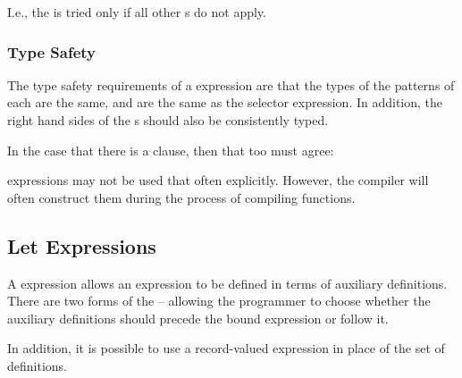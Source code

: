 \begin{aside}
I.e., the   is tried only if all other s do not apply.

\subsubsection{Type Safety}
The type safety requirements of a  expression are that the types of the patterns of each  are the same, and are the same as the selector expression. In addition, the right hand sides of the s should also be consistently typed.

\begin{prooftree}
\end{prooftree}

In the case that there is a  clause, then that too must agree:
\begin{prooftree}
\end{prooftree}

 expressions may not be used that often explicitly. However, the compiler will often construct them during the process of compiling functions.
\end{aside}

\subsection{Let Expressions}
\label{letExpression}

A  expression allows an expression to be defined in terms of  auxiliary definitions. There are two forms of the  -- allowing the programmer to choose whether the auxiliary definitions should precede the bound expression or follow it.

In addition, it is possible to use a record-valued expression in place of the set of definitions.

